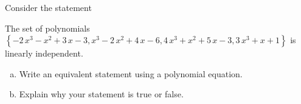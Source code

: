 
\begin{exerciseStatement}


Consider the statement 
\begin{center}\begin{minipage}{0.8\textwidth}
 The set of polynomials \( \left\{ -2 \, x^{3} - x^{2} + 3 \, x - 3 , x^{3} - 2 \, x^{2} + 4 \, x - 6 , 4 \, x^{3} + x^{2} + 5 \, x - 3 , 3 \, x^{3} + x + 1 \right\} \) is linearly independent.
\end{minipage}\end{center}
    


\begin{enumerate}[(a)]
\item  Write an equivalent statement using a polynomial equation.
\item  Explain why your statement is true or false.
\end{enumerate}
    
\end{exerciseStatement}
    
